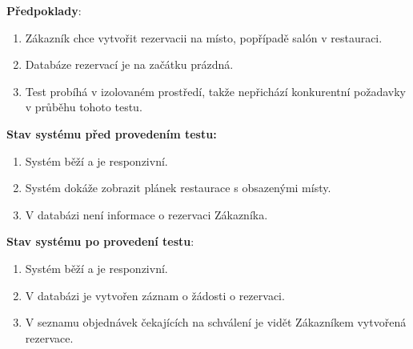 \documentclass[a4paper,10pt]{article}
\begin{document}
\textbf{Předpoklady}: 
\begin{enumerate}
	\item Zákazník chce vytvořit rezervacii na místo, popřípadě salón v restauraci.
	\item Databáze rezervací je na začátku prázdná.
	\item Test probíhá v izolovaném prostředí, takže nepřichází konkurentní požadavky v průběhu tohoto testu.
\end{enumerate}

\textbf{Stav systému před provedením testu:}
\begin{enumerate}
	\item Systém běží a je responzivní.
	\item Systém dokáže zobrazit plánek restaurace s obsazenými místy.
	\item V databázi není informace o rezervaci Zákazníka. 
\end{enumerate}

\textbf{Stav systému po provedení testu}:
\begin{enumerate}
	\item Systém běží a je responzivní.
	\item V databázi je vytvořen záznam o žádosti o rezervaci.
	\item V seznamu objednávek čekajících na schválení je vidět Zákazníkem vytvořená rezervace.
\end{enumerate}
\end{document}
